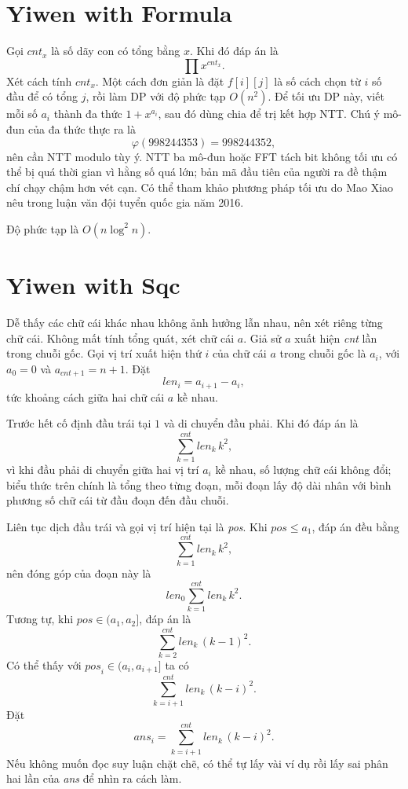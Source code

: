 \documentclass[11pt]{article}
\begin{document}
\section{Yiwen with Formula}

Gọi $\textit{cnt}_x$ là số dãy con có tổng bằng $x$. Khi đó đáp án là
\[
  \prod x^{\textit{cnt}_x}.
\]
Xét cách tính $\textit{cnt}_x$. Một cách đơn giản là đặt $f[i][j]$ là số cách
chọn từ $i$ số đầu để có tổng $j$, rồi làm DP với độ phức tạp $O(n^2)$. Để tối
ưu DP này, viết mỗi số $a_i$ thành đa thức $1+x^{a_i}$, sau đó dùng chia để
trị kết hợp NTT. Chú ý mô-đun của đa thức thực ra là
\[
  \varphi(998244353)=998244352,
\]
nên cần NTT modulo tùy ý. NTT ba mô-đun hoặc FFT tách bit không tối ưu có thể
bị quá thời gian vì hằng số quá lớn; bản mã đầu tiên của người ra đề thậm chí
chạy chậm hơn vét cạn. Có thể tham khảo phương pháp tối ưu do Mao Xiao nêu
trong luận văn đội tuyển quốc gia năm 2016.

Độ phức tạp là $O(n\log^2 n)$.

\section{Yiwen with Sqc}

Dễ thấy các chữ cái khác nhau không ảnh hưởng lẫn nhau, nên xét riêng từng chữ
cái. Không mất tính tổng quát, xét chữ cái $a$. Giả sử $a$ xuất hiện
\textit{cnt} lần trong chuỗi gốc. Gọi vị trí xuất hiện thứ $i$ của chữ cái $a$
trong chuỗi gốc là $a_i$, với $a_0=0$ và $a_{\textit{cnt}+1}=n+1$. Đặt
\[
  \textit{len}_i=a_{i+1}-a_i,
\]
tức khoảng cách giữa hai chữ cái $a$ kề nhau.

Trước hết cố định đầu trái tại $1$ và di chuyển đầu phải. Khi đó đáp án là
\[
  \sum_{k=1}^{\textit{cnt}}\textit{len}_k\,k^2,
\]
vì khi đầu phải di chuyển giữa hai vị trí $a_i$ kề nhau, số lượng chữ cái
không đổi; biểu thức trên chính là tổng theo từng đoạn, mỗi đoạn lấy độ dài
nhân với bình phương số chữ cái từ đầu đoạn đến đầu chuỗi.

Liên tục dịch đầu trái và gọi vị trí hiện tại là \textit{pos}. Khi
$\textit{pos}\le a_1$, đáp án đều bằng
\[
  \sum_{k=1}^{\textit{cnt}}\textit{len}_k\,k^2,
\]
nên đóng góp của đoạn này là
\[
  \textit{len}_0
  \sum_{k=1}^{\textit{cnt}}\textit{len}_k\,k^2.
\]
Tương tự, khi $\textit{pos}\in(a_1,a_2]$, đáp án là
\[
  \sum_{k=2}^{\textit{cnt}}\textit{len}_k\,(k-1)^2.
\]
Có thể thấy với $\textit{pos}_i\in(a_i,a_{i+1}]$ ta có
\[
  \sum_{k=i+1}^{\textit{cnt}}\textit{len}_k\,(k-i)^2.
\]
Đặt
\[
  \textit{ans}_i=
  \sum_{k=i+1}^{\textit{cnt}}\textit{len}_k\,(k-i)^2.
\]
Nếu không muốn đọc suy luận chặt chẽ, có thể tự lấy vài ví dụ rồi lấy sai phân
hai lần của \textit{ans} để nhìn ra cách làm.
\end{document}
